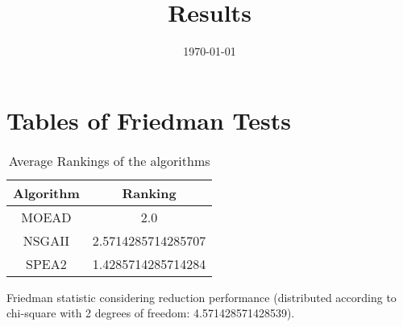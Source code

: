 \documentclass{article}
\title{Results}
\author{}
\date{\today}
\begin{document}
\oddsidemargin 0in \topmargin 0in\maketitle
\section{Tables of Friedman Tests}
\begin{table}[!htp]
\centering
\caption{Average Rankings of the algorithms
}\begin{tabular}{c|c}
Algorithm&Ranking\\
\hline
MOEAD&2.0\\
NSGAII&2.5714285714285707\\
SPEA2&1.4285714285714284\\
\end{tabular}
\end{table}


Friedman statistic considering reduction performance (distributed according to chi-square with 2 degrees of freedom: 4.571428571428539).
\end{document}
